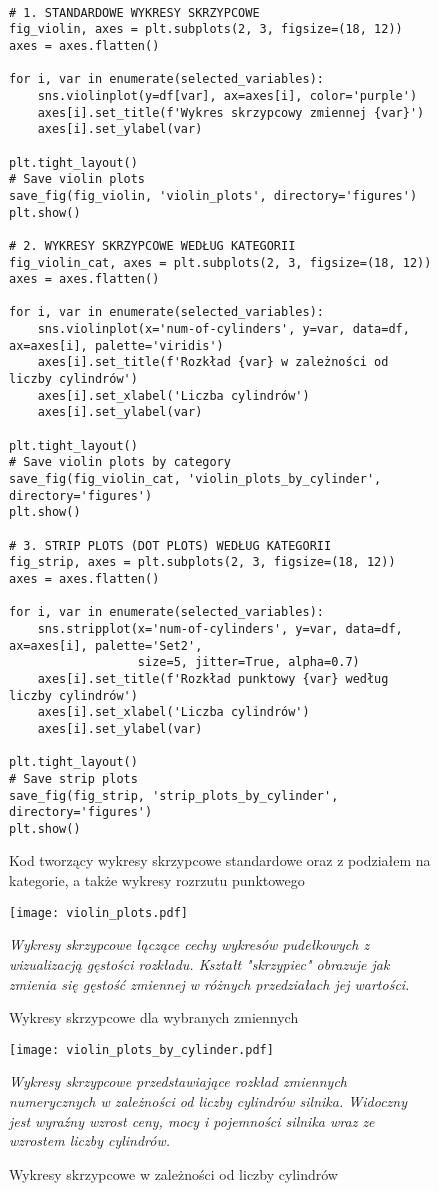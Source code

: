 \documentclass[12pt,a4paper]{article}
\newcommand{\kod}[2]{
    \begin{figure}[H]
        \begin{lstlisting}[style=pythonstyle]
#1
        \end{lstlisting}
        \caption{#2}
    \end{figure}
}
\begin{document}
\kod{
# 1. STANDARDOWE WYKRESY SKRZYPCOWE
fig_violin, axes = plt.subplots(2, 3, figsize=(18, 12))
axes = axes.flatten()

for i, var in enumerate(selected_variables):
    sns.violinplot(y=df[var], ax=axes[i], color='purple')
    axes[i].set_title(f'Wykres skrzypcowy zmiennej {var}')
    axes[i].set_ylabel(var)

plt.tight_layout()
# Save violin plots
save_fig(fig_violin, 'violin_plots', directory='figures')
plt.show()

# 2. WYKRESY SKRZYPCOWE WEDŁUG KATEGORII
fig_violin_cat, axes = plt.subplots(2, 3, figsize=(18, 12))
axes = axes.flatten()

for i, var in enumerate(selected_variables):
    sns.violinplot(x='num-of-cylinders', y=var, data=df, ax=axes[i], palette='viridis')
    axes[i].set_title(f'Rozkład {var} w zależności od liczby cylindrów')
    axes[i].set_xlabel('Liczba cylindrów')
    axes[i].set_ylabel(var)

plt.tight_layout()
# Save violin plots by category
save_fig(fig_violin_cat, 'violin_plots_by_cylinder', directory='figures')
plt.show()

# 3. STRIP PLOTS (DOT PLOTS) WEDŁUG KATEGORII
fig_strip, axes = plt.subplots(2, 3, figsize=(18, 12))
axes = axes.flatten()

for i, var in enumerate(selected_variables):
    sns.stripplot(x='num-of-cylinders', y=var, data=df, ax=axes[i], palette='Set2', 
                  size=5, jitter=True, alpha=0.7)
    axes[i].set_title(f'Rozkład punktowy {var} według liczby cylindrów')
    axes[i].set_xlabel('Liczba cylindrów')
    axes[i].set_ylabel(var)

plt.tight_layout()
# Save strip plots
save_fig(fig_strip, 'strip_plots_by_cylinder', directory='figures')
plt.show()
}{Kod tworzący wykresy skrzypcowe standardowe oraz z podziałem na kategorie, a także wykresy rozrzutu punktowego}

\begin{figure}[H]
    \centering
    \texttt{[image: violin\_plots.pdf]}
    \caption{Wykresy skrzypcowe dla wybranych zmiennych}
    \label{fig:violin_plots}
    \small\textit{Wykresy skrzypcowe łączące cechy wykresów pudełkowych z wizualizacją gęstości rozkładu. Kształt "skrzypiec" obrazuje jak zmienia się gęstość zmiennej w różnych przedziałach jej wartości.}
\end{figure}

\begin{figure}[H]
    \centering
    \texttt{[image: violin\_plots\_by\_cylinder.pdf]}
    \caption{Wykresy skrzypcowe w zależności od liczby cylindrów}
    \label{fig:violin_plots_cylinder}
    \small\textit{Wykresy skrzypcowe przedstawiające rozkład zmiennych numerycznych w zależności od liczby cylindrów silnika. Widoczny jest wyraźny wzrost ceny, mocy i pojemności silnika wraz ze wzrostem liczby cylindrów.}
\end{figure}
\end{document}
